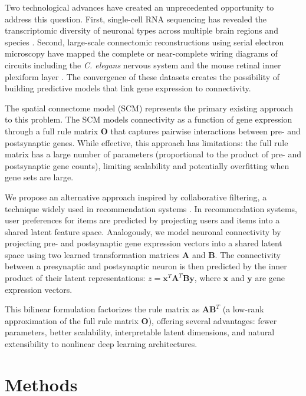 \documentclass[11pt]{article}
\begin{document}
Two technological advances have created an unprecedented opportunity to address this question. First, single-cell RNA sequencing has revealed the transcriptomic diversity of neuronal types across multiple brain regions and species \citep{zeng2017neuronal, shekhar2016comprehensive, tran2019single}. Second, large-scale connectomic reconstructions using serial electron microscopy have mapped the complete or near-complete wiring diagrams of circuits including the \textit{C. elegans} nervous system \citep{varshney2011structural} and the mouse retinal inner plexiform layer \citep{helmstaedter2013connectomic, bae2018digital}. The convergence of these datasets creates the possibility of building predictive models that link gene expression to connectivity.

The spatial connectome model (SCM) \citep{kovacs2020genetic} represents the primary existing approach to this problem. The SCM models connectivity as a function of gene expression through a full rule matrix $\mathbf{O}$ that captures pairwise interactions between pre- and postsynaptic genes. While effective, this approach has limitations: the full rule matrix has a large number of parameters (proportional to the product of pre- and postsynaptic gene counts), limiting scalability and potentially overfitting when gene sets are large.

We propose an alternative approach inspired by collaborative filtering, a technique widely used in recommendation systems \citep{koren2020forecasting}. In recommendation systems, user preferences for items are predicted by projecting users and items into a shared latent feature space. Analogously, we model neuronal connectivity by projecting pre- and postsynaptic gene expression vectors into a shared latent space using two learned transformation matrices $\mathbf{A}$ and $\mathbf{B}$. The connectivity between a presynaptic and postsynaptic neuron is then predicted by the inner product of their latent representations: $z = \mathbf{x}^T \mathbf{A}^T \mathbf{B} \mathbf{y}$, where $\mathbf{x}$ and $\mathbf{y}$ are gene expression vectors.

This bilinear formulation factorizes the rule matrix as $\mathbf{A}\mathbf{B}^T$ (a low-rank approximation of the full rule matrix $\mathbf{O}$), offering several advantages: fewer parameters, better scalability, interpretable latent dimensions, and natural extensibility to nonlinear deep learning architectures.

\section{Methods}
\end{document}
